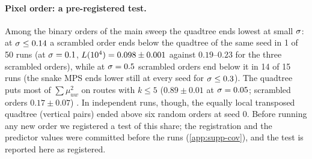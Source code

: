 \paragraph{Pixel order: a pre-registered test.}
Among the binary orders of the main sweep the quadtree ends lowest at small $\sigma$: at $\sigma\le0.14$ a
scrambled order ends below the quadtree of the same seed in 1 of 50 runs (at $\sigma=0.1$,
$L(10^4)=0.098\pm0.001$ against $0.19$--$0.23$ for the three scrambled orders), while at $\sigma=0.5$ scrambled
orders end below it in 14 of 15 runs (the snake MPS ends lower still at every seed for $\sigma\le0.3$). The
quadtree puts most of $\sum\mu_{uw}^2$ on routes with $k\le5$ ($0.89\pm0.01$ at $\sigma=0.05$; scrambled orders
$0.17\pm0.07$) \empirical. In independent runs, though, the equally local transposed quadtree (vertical
pairs) ended above six random orders at seed 0. Before running any new order we registered a test of
this share; the registration and the predictor values were committed before the runs (\cref{app:supp-cov}),
and the test is reported here as registered.
